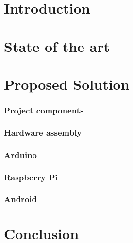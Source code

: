 \documentclass[11pt, a4paper,openany]{article}%
\begin{document}


\setlength{\parindent}{0cm}


\newpage
{} 
\tableofcontents
\clearpage
\listoffigures 
\clearpage

\part{Introduction} 

\newpage


\part{State of the art} 

\newpage



\part{Proposed Solution} 
\section{Project components}

\newpage
\section{Hardware assembly}

\newpage
\section{Arduino}

\newpage
\section{Raspberry Pi}

\newpage
\section{Android} 

\newpage


\part{Conclusion} 


\newpage


\end{document}
